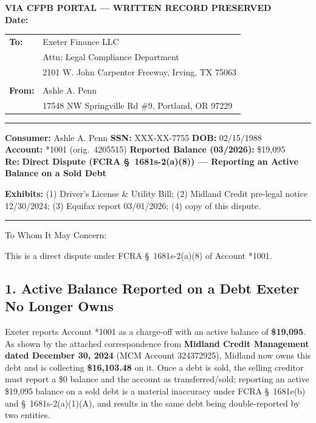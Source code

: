\documentclass[12pt,letterpaper]{article}
\begin{document}
\begin{center}\textbf{VIA CFPB PORTAL --- WRITTEN RECORD PRESERVED}\\ \textbf{Date:} \underline{\hspace{3cm}}\end{center}

\begin{tabular}{@{}ll}
  \textbf{To:} & Exeter Finance LLC \\ & Attn: Legal Compliance Department \\ & 2101 W. John Carpenter Freeway, Irving, TX 75063 \\ & \\
  \textbf{From:} & Ashle A. Penn \\ & 17548 NW Springville Rd \#9, Portland, OR 97229 \\
\end{tabular}

\vspace{1em}\hrule\vspace{1em}
\textbf{Consumer:} Ashle A. Penn \quad \textbf{SSN:} XXX-XX-7755 \quad \textbf{DOB:} 02/15/1988 \\
\textbf{Account:} *1001 (orig.\ 4205515) \quad \textbf{Reported Balance (03/2026):} \$19,095 \\
\textbf{Re:} \textbf{Direct Dispute (FCRA \S~1681s-2(a)(8)) --- Reporting an Active Balance on a Sold Debt}

\vspace{1em}\textbf{Exhibits:} (1) Driver's License \& Utility Bill; (2) Midland Credit pre-legal notice 12/30/2024; (3) Equifax report 03/01/2026; (4) copy of this dispute.
\vspace{1em}\hrule\vspace{1em}

To Whom It May Concern:

This is a direct dispute under FCRA \S~1681s-2(a)(8) of Account *1001.

\subsection*{1. Active Balance Reported on a Debt Exeter No Longer Owns}
Exeter reports Account *1001 as a charge-off with an active balance of \textbf{\$19,095}. As shown by the attached correspondence from \textbf{Midland Credit Management dated December 30, 2024} (MCM Account 324372925), Midland now owns this debt and is collecting \textbf{\$16,103.48} on it. Once a debt is sold, the selling creditor must report a \$0 balance and the account as transferred/sold; reporting an active \$19,095 balance on a sold debt is a material inaccuracy under FCRA \S~1681e(b) and \S~1681s-2(a)(1)(A), and results in the same debt being double-reported by two entities.
\end{document}
